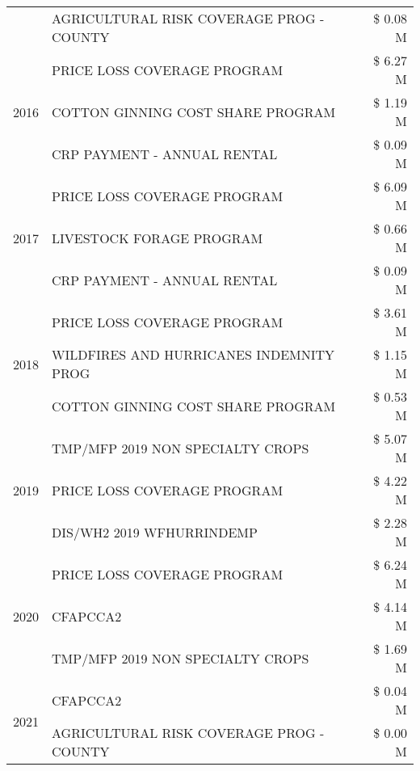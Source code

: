 \begin{tabular}{llr}
 & AGRICULTURAL RISK COVERAGE PROG - COUNTY & \$ 0.08 M \\
\cline{1-3}
\multirow[t]{3}{*}{2016} & PRICE LOSS COVERAGE PROGRAM                   & \$ 6.27 M \\
 & COTTON GINNING COST SHARE PROGRAM             & \$ 1.19 M \\
 & CRP PAYMENT - ANNUAL RENTAL                   & \$ 0.09 M \\
\cline{1-3}
\multirow[t]{3}{*}{2017} & PRICE LOSS COVERAGE PROGRAM & \$ 6.09 M \\
 & LIVESTOCK FORAGE PROGRAM & \$ 0.66 M \\
 & CRP PAYMENT - ANNUAL RENTAL & \$ 0.09 M \\
\cline{1-3}
\multirow[t]{3}{*}{2018} & PRICE LOSS COVERAGE PROGRAM & \$ 3.61 M \\
 & WILDFIRES AND HURRICANES INDEMNITY PROG & \$ 1.15 M \\
 & COTTON GINNING COST SHARE PROGRAM & \$ 0.53 M \\
\cline{1-3}
\multirow[t]{3}{*}{2019} & TMP/MFP 2019 NON SPECIALTY CROPS & \$ 5.07 M \\
 & PRICE LOSS COVERAGE PROGRAM & \$ 4.22 M \\
 & DIS/WH2 2019 WFHURRINDEMP & \$ 2.28 M \\
\cline{1-3}
\multirow[t]{3}{*}{2020} & PRICE LOSS COVERAGE PROGRAM & \$ 6.24 M \\
 & CFAPCCA2 & \$ 4.14 M \\
 & TMP/MFP 2019 NON SPECIALTY CROPS & \$ 1.69 M \\
\cline{1-3}
\multirow[t]{2}{*}{2021} & CFAPCCA2 & \$ 0.04 M \\
 & AGRICULTURAL RISK COVERAGE PROG - COUNTY & \$ 0.00 M \\
\cline{1-3}
\bottomrule
\end{tabular}
